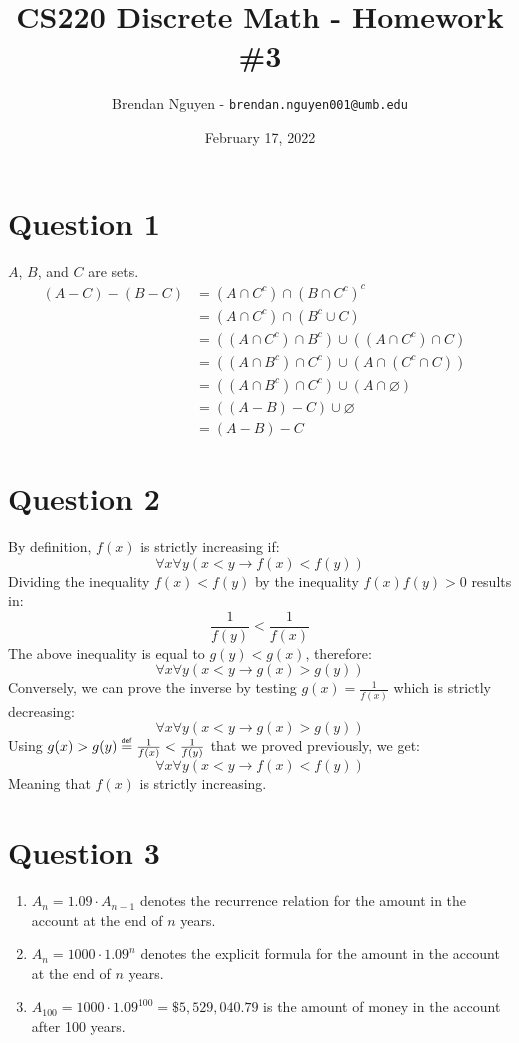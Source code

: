 \documentclass[letterpaper, 12pt]{article}
\title{CS220 Discrete Math - Homework \#3}
\author{Brendan Nguyen - \texttt{brendan.nguyen001@umb.edu}}
\date{February 17, 2022}
\begin{document}
\maketitle

\section*{Question 1}
$A$, $B$, and $C$ are sets.
\begin{align*}
    (A - C) - (B - C) & = (A \cap C^c) \cap (B \cap C^c)^c&\\
    & = (A \cap C^c) \cap (B^c \cup C)&\\
    & = ((A \cap C^c) \cap B^c) \cup ((A \cap C^c) \cap C)&\\
    & = ((A \cap B^c) \cap C^c ) \cup (A \cap (C^c \cap C))&\\
    & = ((A \cap B^c) \cap C^c) \cup (A \cap \varnothing)&\\
    & = ((A - B) - C) \cup \varnothing&\\
    & = (A - B) - C
\end{align*}

\section*{Question 2}
\newcommand*{\defeq}{\stackrel{\mathsmaller{\mathsf{def}}}{=}}

By definition, $f(x)$ is strictly increasing if:
\[\forall x \forall y (x < y \to f(x) < f(y))\]
Dividing the inequality $f(x) < f(y)$ by the inequality $f(x)f(y) > 0$ results in:
\[\frac{1}{f(y)} < \frac{1}{f(x)}\]
The above inequality is equal to $g(y) < g(x)$, therefore:
\[\forall x \forall y (x < y \to g(x) > g(y))\]
Conversely, we can prove the inverse by testing $g(x) = \frac{1}{f(x)}$ which is strictly decreasing:
\[\forall x \forall y (x < y \to g(x) > g(y))\]
Using $g(x) > g(y) \defeq \frac{1}{f(x)} < \frac{1}{f(y)}$ that we proved previously, we get:
\[\forall x \forall y (x < y \to f(x) < f(y))\]
Meaning that $f(x)$ is strictly increasing.

\section*{Question 3}

\begin{enumerate}
    \item $A_n = 1.09 \cdot A_{n-1}$ denotes the recurrence relation for the amount in the account at the end of $n$ years.
    \item $A_n = 1000 \cdot 1.09^n$ denotes the explicit formula for the amount in the account at the end of $n$ years.
    \item $A_{100} = 1000 \cdot 1.09^{100} = \$ 5,529,040.79$ is the amount of money in the account after 100 years.
\end{enumerate}
\end{document}
